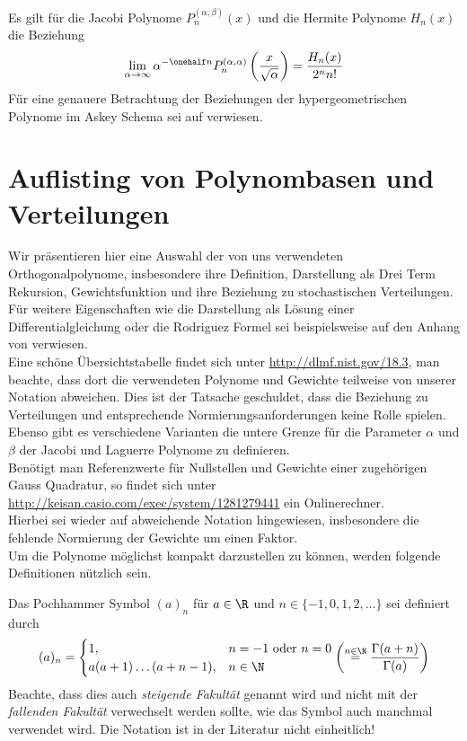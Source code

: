 \begin{mathbsp}
Es gilt für die Jacobi Polynome $P_n^{(\alpha,\beta)}(x)$ und die Hermite Polynome $H_n(x)$ die Beziehung
\[\lim\limits_{\alpha\to\infty}\alpha^{-\onehalf n}P_n^{(\alpha,\alpha)}\left(\frac{x}{\sqrt{\alpha}}\right)=\frac{H_n(x)}{2^nn!}\]
Für eine genauere Betrachtung der Beziehungen der hypergeometrischen Polynome im Askey Schema sei auf \autocite{koekoekswart98} verwiesen.
\end{mathbsp}

\section{Auflisting von Polynombasen und Verteilungen}
Wir präsentieren hier eine Auswahl der von uns verwendeten Orthogonalpolynome, insbesondere ihre Definition, Darstellung als Drei Term Rekursion, Gewichtsfunktion und ihre Beziehung zu stochastischen Verteilungen. Für weitere Eigenschaften wie die Darstellung als Lösung einer Differentialgleichung oder die Rodriguez Formel sei beispielsweise auf den Anhang von \autocite{dongbinxiu2010} verwiesen.\\
Eine schöne Übersichtstabelle findet sich unter \url{http://dlmf.nist.gov/18.3}, man beachte, dass dort die verwendeten Polynome und Gewichte teilweise von unserer Notation abweichen. Dies ist der Tatsache geschuldet, dass die Beziehung zu Verteilungen und entsprechende Normierungsanforderungen keine Rolle spielen. Ebenso gibt es verschiedene Varianten die untere Grenze für die Parameter $\alpha$ und $\beta$ der Jacobi und Laguerre Polynome zu definieren.\\
Benötigt man Referenzwerte für Nullstellen und Gewichte einer zugehörigen Gauss Quadratur, so findet sich unter\\\url{http://keisan.casio.com/exec/system/1281279441} ein Onlinerechner.\\
Hierbei sei wieder auf abweichende Notation hingewiesen, insbesondere die fehlende Normierung der Gewichte um einen Faktor.\\
Um die Polynome möglichst kompakt darzustellen zu können, werden folgende Definitionen nützlich sein.
\begin{mathdef}
Das Pochhammer Symbol $(a)_n$ für $a\in\R$ und $n\in\lbrace -1,0,1,2,\dots\rbrace$ sei definiert durch
\[(a)_n=
   \begin{cases}
   1, &n=-1\text{ oder } n=0\\
   a(a+1)\dots (a+n-1), &n\in\N
   \end{cases}\left(\stackrel{n\in\N}{=}\frac{\Gamma(a+n)}{\Gamma(a)}\right)
   \]
Beachte, dass dies auch \emph{steigende Fakultät} genannt wird und nicht mit der \emph{fallenden Fakultät} verwechselt werden sollte, wie das Symbol auch manchmal verwendet wird. Die Notation ist in der Literatur nicht einheitlich!
\end{mathdef}

